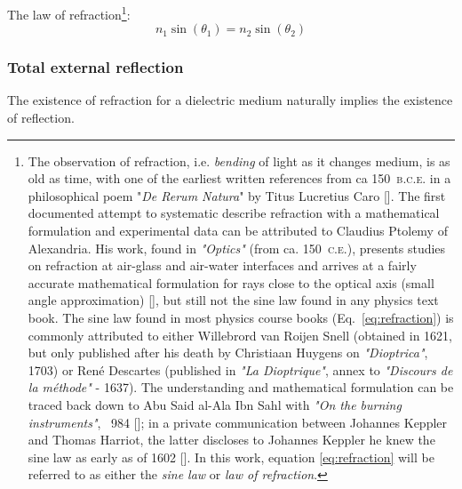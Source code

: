 \begin{refsection}
The law of refraction\footnote{The observation of refraction, i.e. \textit{bending} of light as it changes medium, is as old as time, with one of the earliest written references from ca 150~\textsc{b.c.e.} in a philosophical poem "\textit{De Rerum Natura}" by Titus Lucretius Caro [\cite{Wilk2004}]. The first documented attempt to systematic describe refraction with a mathematical formulation and experimental data can be attributed to Claudius Ptolemy of Alexandria. His work, found in \textit{"Optics"} (from ca. 150~\textsc{c.e.}), presents studies on refraction at air-glass and air-water interfaces and arrives at a fairly accurate mathematical formulation for rays close to the optical axis (small angle approximation) [\cite{Kwan2002}], but still not the sine law found in any physics text book. The sine law found in most physics course books (Eq.~\ref{eq:refraction}) is commonly attributed to either Willebrord van Roijen Snell (obtained in 1621, but only published after his death by Christiaan Huygens on \textit{"Dioptrica"}, 1703) or Ren\'{e} Descartes (published in \textit{"La Dioptrique"}, annex to \textit{"Discours de la m\'{e}thode"} - 1637). The understanding and mathematical formulation can be traced back down to Abu Said al-Ala Ibn Sahl with \textit{"On the burning instruments"}, ~984 [\cite{Rashed1990}]; in a private communication between Johannes Keppler and Thomas Harriot, the latter discloses to Johannes Keppler he knew the sine law as early as of 1602 [\cite{Kwan2002,Lohne1956}]. In this work, equation \ref{eq:refraction} will be referred to as either the \textit{sine law} or \textit{law of refraction}.}:
\begin{equation}\label{eq:refraction}
    n_1\sin(\theta_1)= n_2\sin(\theta_2)
\end{equation}

\subsubsection*{Total external reflection}

The existence of refraction for a dielectric medium naturally implies the existence of reflection. 


\end{refsection}
